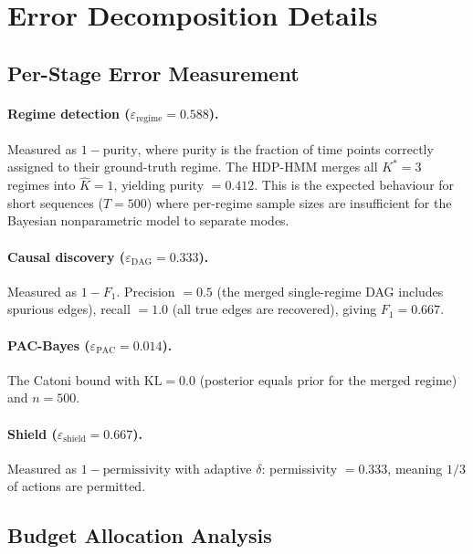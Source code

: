 \documentclass[11pt]{article}
\newcommand{\KL}{\mathrm{KL}}
\begin{document}
\section{Error Decomposition Details}\label{app:errordecomp}

\subsection{Per-Stage Error Measurement}

\paragraph{Regime detection ($\varepsilon_{\mathrm{regime}} = 0.588$).}
Measured as $1 - \text{purity}$, where purity is the fraction of
time points correctly assigned to their ground-truth regime.
The HDP-HMM merges all $K^*{=}3$ regimes into $\hat{K}{=}1$,
yielding purity $= 0.412$.  This is the expected behaviour for
short sequences ($T{=}500$) where per-regime sample sizes are
insufficient for the Bayesian nonparametric model to separate modes.

\paragraph{Causal discovery ($\varepsilon_{\mathrm{DAG}} = 0.333$).}
Measured as $1 - F_1$.  Precision $= 0.5$ (the merged single-regime
DAG includes spurious edges), recall $= 1.0$ (all true edges are
recovered), giving $F_1 = 0.667$.

\paragraph{PAC-Bayes ($\varepsilon_{\mathrm{PAC}} = 0.014$).}
The Catoni bound with $\KL = 0.0$ (posterior equals prior for the
merged regime) and $n = 500$.

\paragraph{Shield ($\varepsilon_{\mathrm{shield}} = 0.667$).}
Measured as $1 - \text{permissivity}$ with adaptive $\delta$:
permissivity $= 0.333$, meaning $1/3$ of actions are permitted.

\subsection{Budget Allocation Analysis}
\end{document}
